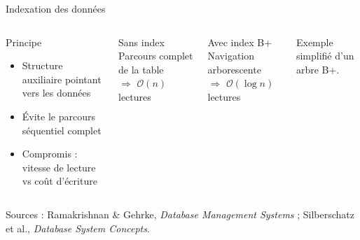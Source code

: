 \documentclass[a4paper,12pt]{beamer}
\begin{document}
\begin{frame}{Indexation des données}
    \begin{columns}[T]
        \begin{block}{Principe}
            \footnotesize
            \begin{itemize}
                \item Structure auxiliaire pointant vers les données
                \item Évite le parcours séquentiel complet
                \item Compromis : vitesse de lecture vs coût d'écriture
            \end{itemize}
        \end{block}
        \vspace{0.2cm}
        \begin{alertblock}{Sans index}
            \centering\scriptsize
            Parcours complet de la table\\
            $\Rightarrow$ $\mathcal{O}(n)$ lectures
        \end{alertblock}
        \vspace{0.15cm}
        \begin{exampleblock}{Avec index B+}
            \centering\scriptsize
            Navigation arborescente\\
            $\Rightarrow$ $\mathcal{O}(\log n)$ lectures
        \end{exampleblock}

        \centering
        \vspace{0.15cm}
        {\scriptsize Exemple simplifié d'un arbre B+.}
    \end{columns}
    \vfill
    {\tiny Sources : Ramakrishnan \& Gehrke, \textit{Database Management Systems} ;
    Silberschatz et al., \textit{Database System Concepts}.}
\end{frame}
\end{document}
